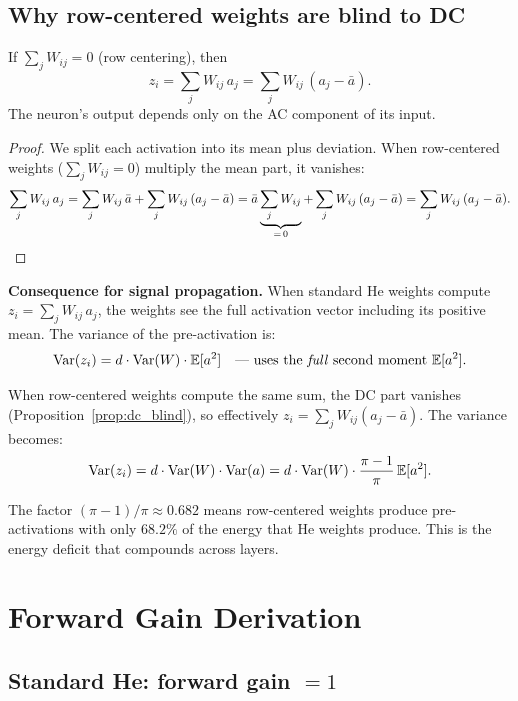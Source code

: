 \subsection{Why row-centered weights are blind to DC}

\begin{proposition}[DC blindness]
\label{prop:dc_blind}
If $\sum_j W_{ij} = 0$ (row centering), then
\[
  z_i = \sum_j W_{ij}\, a_j = \sum_j W_{ij}\,(a_j - \bar{a}).
\]
The neuron's output depends only on the AC component of its input.
\end{proposition}

\begin{proof}
We split each activation into its mean plus deviation.
When row-centered weights ($\sum_j W_{ij} = 0$) multiply the mean
part, it vanishes:
\[
  \sum_j W_{ij}\, a_j
  = \sum_j W_{ij}\,\bar{a} + \sum_j W_{ij}\,(a_j - \bar{a})
  = \bar{a}\underbrace{\sum_j W_{ij}}_{=\,0}
    + \sum_j W_{ij}\,(a_j - \bar{a})
  = \sum_j W_{ij}\,(a_j - \bar{a}).
  \qedhere
\]
\end{proof}

\noindent
\textbf{Consequence for signal propagation.}
When standard He weights compute $z_i = \sum_j W_{ij}\, a_j$, the
weights see the full activation vector including its positive mean.
The variance of the pre-activation is:
\[
  \operatorname{Var}(z_i) = d \cdot \operatorname{Var}(W) \cdot \mathbb{E}[a^2]
  \quad\text{--- uses the \emph{full} second moment $\mathbb{E}[a^2]$.}
\]

When row-centered weights compute the same sum, the DC part vanishes
(Proposition~\ref{prop:dc_blind}), so effectively
$z_i = \sum_j W_{ij}(a_j - \bar{a})$.  The variance becomes:
\[
  \operatorname{Var}(z_i) = d \cdot \operatorname{Var}(W) \cdot \operatorname{Var}(a)
  = d \cdot \operatorname{Var}(W) \cdot \frac{\pi-1}{\pi}\,\mathbb{E}[a^2].
\]

The factor $(\pi-1)/\pi \approx 0.682$ means row-centered weights
produce pre-activations with only $68.2\%$ of the energy that He
weights produce.  This is the energy deficit that compounds across
layers.

\section{Forward Gain Derivation}
\label{sec:fwd_gain_derivation}

\subsection{Standard He: forward gain $= 1$}

